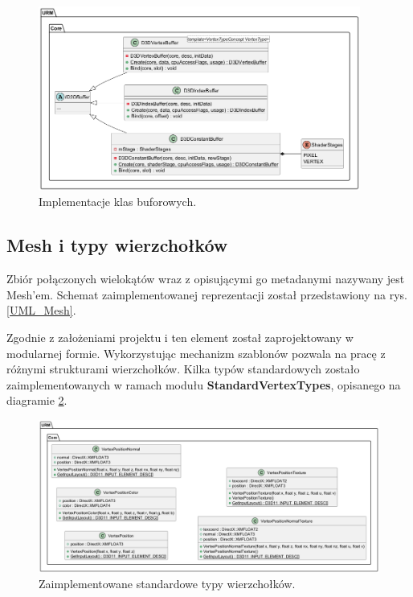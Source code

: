	\begin{figure}[h!]
		\centering
		\includegraphics[width=400px]{images/UML/buffers.png}
		\caption{Implementacje klas buforowych.}
		\label{UML_Buffers}
	\end{figure}
	
	\vfill
	\clearpage
	
\subsection{Mesh i typy wierzchołków}
\label{SSMeshVertexTypeConcept}
	Zbiór połączonych wielokątów wraz z opisującymi go metadanymi nazywany jest Mesh'em. Schemat zaimplementowanej reprezentacji został przedstawiony na rys. \ref{UML_Mesh}.
	
	Zgodnie z założeniami projektu i ten element został zaprojektowany w modularnej formie. Wykorzystując mechanizm szablonów pozwala na pracę z różnymi strukturami wierzchołków. Kilka typów standardowych zostało zaimplementowanych w ramach modułu \textbf{StandardVertexTypes}, opisanego na diagramie \ref{UML_VertexTypes}.
	
	\begin{figure}[h!]
		\centering
		\includegraphics[width=\textwidth]{images/UML/vertextypes.png}
		\caption{Zaimplementowane standardowe typy wierzchołków.}
		\label{UML_VertexTypes}
	\end{figure}
	
